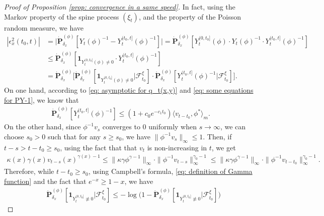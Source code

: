 \documentclass[12pt, a4paper]{amsart}
\theoremstyle{definition}
\numberwithin{equation}{section}
\begin{document}
\begin{proof}[Proof of Proposition \ref{prop: convergence in a same speed}]
	In fact, using the Markov property of the spine process $(\xi_t)$, and the property of the Poisson random measure, we have 
\[\label{eq:epsilon-2}\begin{split}
	|\epsilon_x^2(t_0,t)|
	&= \big| \dot{\mathbf P}_{\delta_x}^{(\phi)}[Y_t(\phi)^{-1} - Y^{(t_0,t]}_t(\phi)^{-1}] \big|
	= \dot{\mathbf P}_{\delta_x}^{(\phi)}[Y_t^{(0,t_0]}(\phi)\cdot Y_t(\phi)^{-1}\cdot Y^{(t_0,t]}_t(\phi)^{-1}]
	\\&\leq \dot{\mathbf P}_{\delta_x}^{(\phi)}[\mathbf 1_{Y_t^{(0,t_0]}(\phi)\neq 0}\cdot Y^{(t_0,t]}_t(\phi)^{-1}]
	\\&= \dot{\mathbf P}_{\delta_x}^{(\phi)} \big[\dot{\mathbf P}_{\delta_x}^{(\phi)}[\mathbf 1_{Y_t^{(0,t_0]}(\phi)\neq 0}|\mathscr F^\xi_{t_0}] \cdot \dot{\mathbf P}_{\delta_x}^{(\phi)} [ Y^{(t_0,t]}_t(\phi)^{-1}|\mathscr F^\xi_{t_0}] \big].
\end{split}\]
	On one hand, according to \eqref{eq: asymptotic for q_t(x,y)} and \eqref{eq: some equations for PY-1}, we know that
\[\label{eq:epsilon-2-final}\begin{split}
	\dot{\mathbf P}_{\delta_x}^{(\phi)}[ Y^{(t_0,t]}_t(\phi)^{-1}]
	\leq (1+c_0 e^{-c_1 t_0}) \langle v_{t-t_0},\phi^* \rangle_m.
\end{split}\]
	On the other hand, since $\phi^{-1}v_s$ converges to $0$ uniformly when $s\to \infty$, we can choose  $s_0>0$ such that for any $s\geq s_0$, we have $\|\phi^{-1}v_s\|_{\infty} \leq 1$.
	Then, if $t-s > t-t_0 \geq s_0$, using the fact that  that $v_t$ is non-increasing in $t$, we get
\[\begin{split}
	\kappa(x)\gamma(x) v_{t-s}(x)^{\gamma(x)-1}
	\leq \|\kappa \gamma \phi^{\gamma - 1}\|_\infty \cdot \|\phi^{-1} v_{t-s}\|^{\gamma_0-1}_\infty
	\leq \|\kappa\gamma\phi^{\gamma - 1}\|_\infty \cdot \|\phi^{-1}v_{t-t_0}\|^{\gamma_0-1}_\infty.
\end{split}\]
	Therefore, while $t-t_0 \geq s_0$, using Campbell's formula, \eqref{eq: definition of Gamma function} and the fact that $e^{-x} \geq 1-x$, we have 
\[\begin{split}
	&\dot{\mathbf P}_{\delta_x}^{(\phi)}[\mathbf 1_{Y_t^{(0,t_0]}\not \equiv  0}|\mathscr F^\xi_{t_0}]
	\leq - \log \big( 1- \dot{\mathbf P}_{\delta_x}^{(\phi)}[\mathbf 1_{Y_t^{(0,t_0]}\not \equiv  0}|\mathscr F^\xi_{t_0}]\big)

\end{split}\]
\end{proof}
\end{document}
